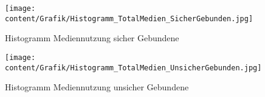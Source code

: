 
\begin{figure}[h]
  \centering
     \texttt{[image: content/Grafik/Histogramm\_TotalMedien\_SicherGebunden.jpg]}
  \captionsetup{margin=80pt}
  \caption{Histogramm Mediennutzung sicher Gebundene}
  \label{fig:AppHistogrammSicherGebunden}
\end{figure}
\begin{figure}[h]
  \centering
     \texttt{[image: content/Grafik/Histogramm\_TotalMedien\_UnsicherGebunden.jpg]}
  \captionsetup{margin=80pt}
  \caption{Histogramm Mediennutzung unsicher Gebundene}
  \label{fig:AppHistogrammUnsicherGebunden}
\end{figure}




